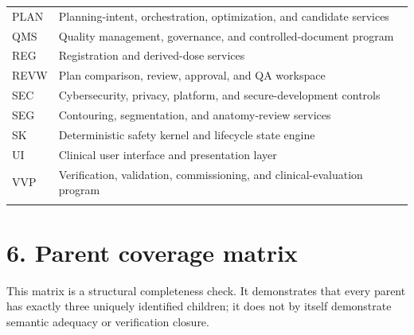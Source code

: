 \documentclass[11pt,letterpaper]{article}
\begin{document}
\begin{small}
\begin{longtable}{@{}L{0.14\textwidth}L{0.78\textwidth}@{}}
\addlinespace[2pt]
PLAN & Planning-intent, orchestration, optimization, and candidate services \\
\addlinespace[2pt]
QMS & Quality management, governance, and controlled-document program \\
\addlinespace[2pt]
REG & Registration and derived-dose services \\
\addlinespace[2pt]
REVW & Plan comparison, review, approval, and QA workspace \\
\addlinespace[2pt]
SEC & Cybersecurity, privacy, platform, and secure-development controls \\
\addlinespace[2pt]
SEG & Contouring, segmentation, and anatomy-review services \\
\addlinespace[2pt]
SK & Deterministic safety kernel and lifecycle state engine \\
\addlinespace[2pt]
UI & Clinical user interface and presentation layer \\
\addlinespace[2pt]
VVP & Verification, validation, commissioning, and clinical-evaluation program \\
\addlinespace[2pt]
\end{longtable}
\end{small}

\section{6. Parent coverage matrix}

This matrix is a structural completeness check. It demonstrates that every parent has exactly three uniquely identified children; it does not by itself demonstrate semantic adequacy or verification closure.
\end{document}
